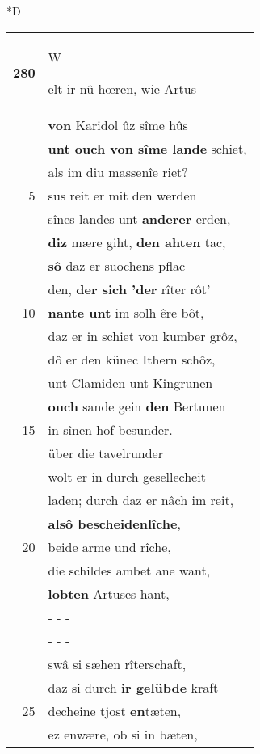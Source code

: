 \documentclass[8pt,a4paper,notitlepage]{article}
\begin{document}
\begin{table}[ht]
\begin{minipage}[t]{0.5\linewidth}
\small
\begin{center}*D
\end{center}
\begin{tabular}{rl}
\textbf{280} & \begin{large}W\end{large}elt ir nû hœren, wie Artus\\ 
 & \textbf{von} Karidol ûz sîme hûs\\ 
 & \textbf{unt ouch von sîme lande} schiet,\\ 
 & als im diu massenîe riet?\\ 
5 & sus reit er mit den werden\\ 
 & sînes landes unt \textbf{anderer} erden,\\ 
 & \textbf{diz} mære giht, \textbf{den ahten} tac,\\ 
 & \textbf{sô} daz er suochens pflac\\ 
 & den, \textbf{der sich 'der} rîter rôt'\\ 
10 & \textbf{nante unt} im solh êre bôt,\\ 
 & daz er in schiet von kumber grôz,\\ 
 & dô er den künec Ithern schôz,\\ 
 & unt Clamiden unt Kingrunen\\ 
 & \textbf{ouch} sande gein \textbf{den} Bertunen\\ 
15 & in sînen hof besunder.\\ 
 & über die tavelrunder\\ 
 & wolt er in durch gesellecheit\\ 
 & laden; durch daz er nâch im reit,\\ 
 & \textbf{alsô bescheidenlîche},\\ 
20 & beide arme und rîche,\\ 
 & die schildes ambet ane want,\\ 
 & \textbf{lobten} Artuses hant,\\ 
 & \multicolumn{1}{l}{ - - - }\\ 
 & \multicolumn{1}{l}{ - - - }\\ 
 & swâ si sæhen rîterschaft,\\ 
 & daz si durch \textbf{ir gelübde} kraft\\ 
25 & decheine tjost \textbf{en}tæten,\\ 
 & ez enwære, ob si in bæten,\\ 

\end{tabular}
\end{minipage}
\end{table}
\end{document}
